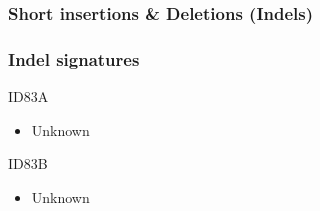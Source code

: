 \documentclass{beamer}
\begin{document}
    \subsubsection{Short insertions \& Deletions (Indels)}
    \begin{frame}[allowframebreaks]
        \frametitle{Indel signatures}

        \begin{block}{ID83A}
            \begin{itemize}
                \item Unknown
            \end{itemize}
        \end{block}

        \begin{block}{ID83B}
            \begin{itemize}
                \item Unknown
            \end{itemize}
        \end{block}
    \end{frame}
\end{document}
